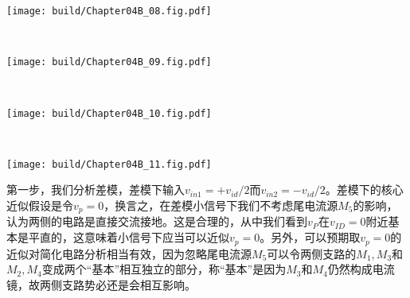 \begin{Figure}[电流镜负载差分放大器的小信号电路]
    \begin{FigureSub}
        \texttt{[image: build/Chapter04B\_08.fig.pdf]}
    \end{FigureSub}\\ \vspace{0.7cm}
    \begin{FigureSub}
        \texttt{[image: build/Chapter04B\_09.fig.pdf]}
    \end{FigureSub}\\ \vspace{0.7cm}
    \begin{FigureSub}
        \texttt{[image: build/Chapter04B\_10.fig.pdf]}
    \end{FigureSub}\\ \vspace{0.7cm}
    \begin{FigureSub}
        \texttt{[image: build/Chapter04B\_11.fig.pdf]}
    \end{FigureSub}
\end{Figure}
第一步，我们分析差模，差模下输入$v_{in1}=+v_{id}/2$而$v_{in2}=-v_{id}/2$。差模下的核心近似假设是令$v_p=0$，换言之，在差模小信号下我们不考虑尾电流源$M_5$的影响，认为两侧的电路是直接交流接地。这是合理的，从中我们看到$v_P$在$v_{ID}=0$附近基本是平直的，这意味着小信号下应当可以近似$v_p=0$。另外，可以预期取$v_p=0$的近似对简化电路分析相当有效，因为忽略尾电流源$M_5$可以令两侧支路的$M_1,M_3$和$M_2,M_4$变成两个“基本”相互独立的部分，称“基本”是因为$M_3$和$M_4$仍然构成电流镜，故两侧支路势必还是会相互影响。


